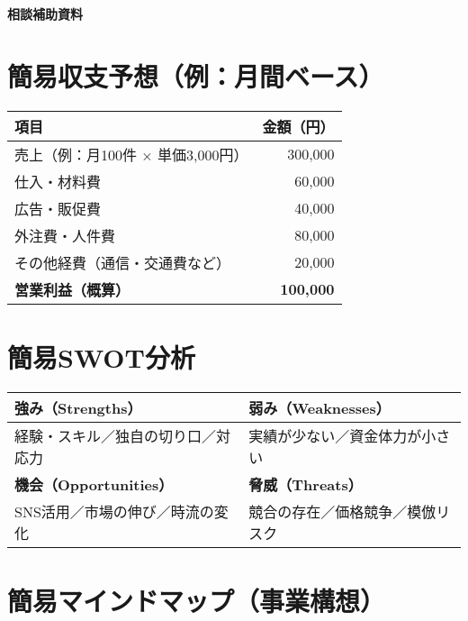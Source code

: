 \documentclass[a4paper,12pt]{article}
\begin{document}
\begin{center}
    {\LARGE \bf 相談補助資料}
\end{center}

\vspace{3mm}

\section{簡易収支予想（例：月間ベース）}
\vspace{2mm}
\begin{tabular}{|p{8cm}|r|}
  \hline
  \textbf{項目} & \textbf{金額（円）} \\
  \hline
  売上（例：月100件 × 単価3,000円） & 300,000 \\
  \hline
  仕入・材料費 & 60,000 \\
  \hline
  広告・販促費 & 40,000 \\
  \hline
  外注費・人件費 & 80,000 \\
  \hline
  その他経費（通信・交通費など） & 20,000 \\
  \hline
  \textbf{営業利益（概算）} & \textbf{100,000} \\
  \hline
\end{tabular}

\vspace{5mm}

\section{簡易SWOT分析}
\vspace{2mm}
\begin{tabular}{|p{7cm}|p{7cm}|}
  \hline
  \textbf{強み（Strengths）} & \textbf{弱み（Weaknesses）} \\
  \hline
  経験・スキル／独自の切り口／対応力 & 実績が少ない／資金体力が小さい \\
  \hline
  \textbf{機会（Opportunities）} & \textbf{脅威（Threats）} \\
  \hline
  SNS活用／市場の伸び／時流の変化 & 競合の存在／価格競争／模倣リスク \\
  \hline
\end{tabular}

\vspace{5mm}

\section{簡易マインドマップ（事業構想）}
\end{document}
